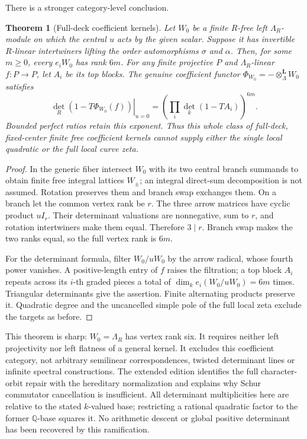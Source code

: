 \documentclass[11pt,oneside,openany]{book}
\newtheorem{theorem}{Theorem}[chapter]
\theoremstyle{definition}\newtheorem{definition}[theorem]{Definition}
\theoremstyle{remark}\newtheorem{remark}[theorem]{Remark}
\begin{document}
There is a stronger category-level conclusion.
\begin{theorem}[Full-deck coefficient kernels]\label{thm:full-deck-kernel}
Let $W_0$ be a finite $R$-free left $\Lambda_R$-module on which the central $u$ acts by the given scalar. Suppose it has invertible $R$-linear intertwiners lifting the order automorphisms $\sigma$ and $\alpha$. Then, for some $m\ge0$, every $e_iW_0$ has rank $6m$. For any finite projective $P$ and $\Lambda_R$-linear $f:P\to P$, let $A_i$ be its top blocks. The genuine coefficient functor $\Phi_{W_0}= -\otimes_\Lambda^{\mathbf L} W_0$ satisfies
\[
 \left.\det_R(1-T\Phi_{W_0}(f))\right|_{u=0}
 =\left(\prod_i\det_k(1-TA_i)\right)^{6m}.
\]
Bounded perfect ratios retain this exponent. Thus this whole class of full-deck, fixed-center finite free coefficient kernels cannot supply either the single local quadratic or the full local curve zeta.
\end{theorem}
\begin{proof}
In the generic fiber intersect $W_0$ with its two central branch summands to obtain finite free integral lattices $W_\pm$; an integral direct-sum decomposition is not assumed. Rotation preserves them and branch swap exchanges them. On a branch let the common vertex rank be $r$. The three arrow matrices have cyclic product $uI_r$. Their determinant valuations are nonnegative, sum to $r$, and rotation intertwiners make them equal. Therefore $3\mid r$. Branch swap makes the two ranks equal, so the full vertex rank is $6m$.

For the determinant formula, filter $W_0/uW_0$ by the arrow radical, whose fourth power vanishes. A positive-length entry of $f$ raises the filtration; a top block $A_i$ repeats across its $i$-th graded pieces a total of $\dim_k e_i(W_0/uW_0)=6m$ times. Triangular determinants give the assertion. Finite alternating products preserve it. Quadratic degree and the uncancelled simple pole of the full local zeta exclude the targets as before.
\end{proof}
This theorem is sharp: $W_0=\Lambda_R$ has vertex rank six. It requires neither left projectivity nor left flatness of a general kernel. It excludes this coefficient category, not arbitrary semilinear correspondences, twisted determinant lines or infinite spectral constructions. The extended edition identifies the full character-orbit repair with the hereditary normalization and explains why Schur commutator cancellation is insufficient. All determinant multiplicities here are relative to the stated $k$-valued base; restricting a rational quadratic factor to the former $\mathbb Q$-base squares it. No arithmetic descent or global positive determinant has been recovered by this ramification.
\end{document}
